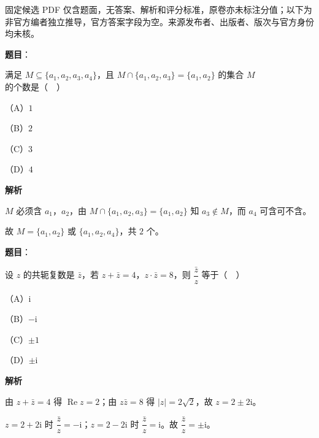 

\begin{gktip}
固定候选 PDF 仅含题面，无答案、解析和评分标准，原卷亦未标注分值；以下为非官方编者独立推导，官方答案字段为空。来源发布者、出版者、版次与官方身份均未核。
\end{gktip}

\begin{answer}

\textbf{题目}：

满足 $M\subseteq\{a_1,a_2,a_3,a_4\}$，且 $M\cap\{a_1,a_2,a_3\}=\{a_1,a_2\}$ 的集合 $M$ 的个数是（　）

（A）$1$

（B）$2$

（C）$3$

（D）$4$

\textbf{解析}

$M$ 必须含 $a_1$，$a_2$，由 $M\cap\{a_1,a_2,a_3\}=\{a_1,a_2\}$ 知 $a_3\notin M$，而 $a_4$ 可含可不含。

故 $M=\{a_1,a_2\}$ 或 $\{a_1,a_2,a_4\}$，共 $2$ 个。


\end{answer}
\begin{answer}

\textbf{题目}：

设 $z$ 的共轭复数是 $\bar z$，若 $z+\bar z=4$，$z\cdot\bar z=8$，则 $\dfrac{\bar z}{z}$ 等于（　）

（A）$\mathrm i$

（B）$-\mathrm i$

（C）$\pm1$

（D）$\pm\mathrm i$

\textbf{解析}

由 $z+\bar z=4$ 得 $\operatorname{Re}z=2$；由 $z\bar z=8$ 得 $|z|=2\sqrt2$，故 $z=2\pm2\mathrm i$。

$z=2+2\mathrm i$ 时 $\dfrac{\bar z}z=-\mathrm i$；$z=2-2\mathrm i$ 时 $\dfrac{\bar z}z=\mathrm i$。故 $\dfrac{\bar z}z=\pm\mathrm i$。


\end{answer}
